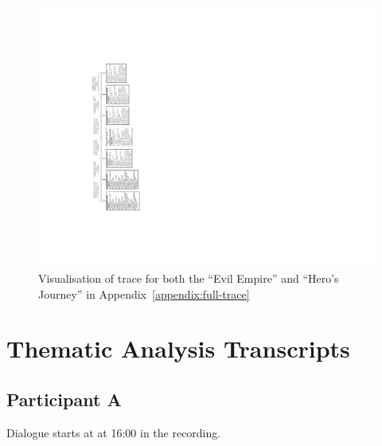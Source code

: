 \documentclass[11pt]{report}
\newif\ifdraft
\begin{document}
\begin{figure}[!p]
\centerline{\includegraphics[height=0.9\textheight]{hjee70-rot.pdf}}
\caption{Visualisation of trace for both the ``Evil Empire'' and ``Hero's Journey'' in Appendix~\ref{appendix:full-trace}}\label{fig:hjee-trace}
\end{figure}

\chapter{Thematic Analysis Transcripts}
\label{appendix:transcripts}

\ifdraft
\def\feature#1{\todo[disable,color=green,size=\scriptsize]{\textbf{Feature:} #1}}
\def\usability#1{\todo[disable,color=cyan,size=\scriptsize]{\textbf{Usability:} #1}}
\def\bug#1{\todo[disable,color=red,size=\scriptsize]{\textbf{Limitation:} #1}}
\def\syntax#1{\todo[disable,color=yellow,size=\scriptsize]{\textbf{Syntax:} #1}}
\else
\def\feature#1{\todo[color=green,size=\scriptsize]{\textbf{Feature:} #1}}
\def\usability#1{\todo[color=cyan,size=\scriptsize]{\textbf{Usability:} #1}}
\def\bug#1{\todo[color=red,size=\scriptsize]{\textbf{Limitation:} #1}}
\def\syntax#1{\todo[color=yellow,size=\scriptsize]{\textbf{Syntax:} #1}}
\fi

\section{Participant A}
Dialogue starts at at 16:00 in the recording.
\end{document}
